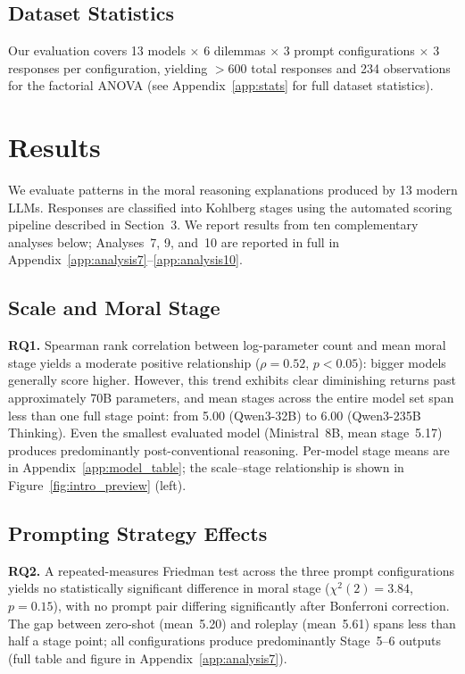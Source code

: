\documentclass{article}
\begin{document}
\subsection{Dataset Statistics}

Our evaluation covers 13 models $\times$ 6 dilemmas $\times$ 3 prompt configurations $\times$ 3 responses per configuration, yielding $>$600 total responses and 234 observations for the factorial ANOVA (see Appendix~\ref{app:stats} for full dataset statistics).


\section{Results}
We evaluate patterns in the moral reasoning explanations produced by 13 modern LLMs. Responses are classified into Kohlberg stages using the automated scoring pipeline described in Section~3. We report results from ten complementary analyses below; Analyses~7, 9, and~10 are reported in full in Appendix~\ref{app:analysis7}--\ref{app:analysis10}.

\subsection{Scale and Moral Stage}

\textbf{RQ1.} Spearman rank correlation between log-parameter count and mean moral stage yields a moderate positive relationship ($\rho = 0.52$, $p < 0.05$): bigger models generally score higher. However, this trend exhibits clear diminishing returns past approximately 70B parameters, and mean stages across the entire model set span less than one full stage point: from 5.00 (Qwen3-32B) to 6.00 (Qwen3-235B Thinking). Even the smallest evaluated model (Ministral~8B, mean stage~5.17) produces predominantly post-conventional reasoning. Per-model stage means are in Appendix~\ref{app:model_table}; the scale--stage relationship is shown in Figure~\ref{fig:intro_preview} (left).

\subsection{Prompting Strategy Effects}

\textbf{RQ2.} A repeated-measures Friedman test across the three prompt configurations yields no statistically significant difference in moral stage ($\chi^2(2) = 3.84$, $p = 0.15$), with no prompt pair differing significantly after Bonferroni correction. The gap between zero-shot (mean~5.20) and roleplay (mean~5.61) spans less than half a stage point; all configurations produce predominantly Stage~5--6 outputs (full table and figure in Appendix~\ref{app:analysis7}).
\end{document}

